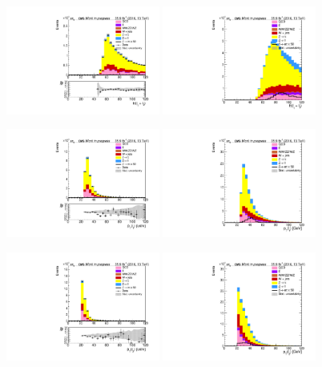 \begin{figure}[htp]
	\includegraphics[width=0.45\textwidth]{plots/et/EnergySum_CR.pdf}
	\includegraphics[width=0.45\textwidth]{plots/et/EnergySum_withsignal.pdf}

	\includegraphics[width=0.45\textwidth]{plots/et/TransverseMomentum1_CR.pdf}
	\includegraphics[width=0.45\textwidth]{plots/et/TransverseMomentum1_withsignal.pdf}

	\includegraphics[width=0.45\textwidth]{plots/et/TransverseMomentum2_CR.pdf}
	\includegraphics[width=0.45\textwidth]{plots/et/TransverseMomentum2_withsignal.pdf}
\end{figure}


